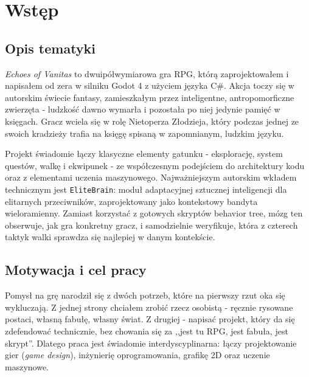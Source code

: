 \chapter{Wstęp}

\section{Opis tematyki}

\textit{Echoes of Vanitas} to dwuipółwymiarowa gra RPG, którą zaprojektowałem i napisałem od zera w silniku Godot 4 z użyciem języka C\#. Akcja toczy się w autorskim świecie fantasy, zamieszkałym przez inteligentne, antropomorficzne zwierzęta - ludzkość dawno wymarła i pozostała po niej jedynie pamięć w księgach. Gracz wciela się w rolę Nietoperza Złodzieja, który podczas jednej ze swoich kradzieży trafia na księgę spisaną w zapomnianym, ludzkim języku.

Projekt świadomie łączy klasyczne elementy gatunku - eksplorację, system questów, walkę i ekwipunek - ze współczesnym podejściem do architektury kodu oraz z elementami uczenia maszynowego. Najważniejszym autorskim wkładem technicznym jest \texttt{EliteBrain}: moduł adaptacyjnej sztucznej inteligencji dla elitarnych przeciwników, zaprojektowany jako kontekstowy bandyta wieloramienny. Zamiast korzystać z gotowych skryptów behavior tree, mózg ten obserwuje, jak gra konkretny gracz, i samodzielnie weryfikuje, która z czterech taktyk walki sprawdza się najlepiej w danym kontekście.

\section{Motywacja i cel pracy}

Pomysł na grę narodził się z dwóch potrzeb, które na pierwszy rzut oka się wykluczają. Z jednej strony chciałem zrobić rzecz osobistą - ręcznie rysowane postaci, własną fabułę, własny świat. Z drugiej - napisać projekt, który da się zdefendować technicznie, bez chowania się za ,,jest tu RPG, jest fabuła, jest skrypt''. Dlatego praca jest świadomie interdyscyplinarna: łączy projektowanie gier (\textit{game design}), inżynierię oprogramowania, grafikę 2D oraz uczenie maszynowe.

